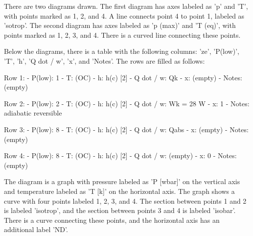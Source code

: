 There are two diagrams drawn. The first diagram has axes labeled as 'p' and 'T', with points marked as 1, 2, and 4. A line connects point 4 to point 1, labeled as 'sotrop'. The second diagram has axes labeled as 'p (max)' and 'T (eq)', with points marked as 1, 2, 3, and 4. There is a curved line connecting these points.

Below the diagrams, there is a table with the following columns: 'ze', 'P(low)', 'T', 'h', 'Q dot / w', 'x', and 'Notes'. The rows are filled as follows:

Row 1:
- P(low): 1
- T: (OC)
- h: h(c) [2]
- Q dot / w: Qk
- x: (empty)
- Notes: (empty)

Row 2:
- P(low): 2
- T: (OC)
- h: h(c) [2]
- Q dot / w: Wk = 28 W
- x: 1
- Notes: adiabatic reversible

Row 3:
- P(low): 8
- T: (OC)
- h: h(c) [2]
- Q dot / w: Qabs
- x: (empty)
- Notes: (empty)

Row 4:
- P(low): 8
- T: (OC)
- h: h(c) [2]
- Q dot / w: (empty)
- x: 0
- Notes: (empty)

The diagram is a graph with pressure labeled as 'P [wbar]' on the vertical axis and temperature labeled as 'T [k]' on the horizontal axis. The graph shows a curve with four points labeled 1, 2, 3, and 4. The section between points 1 and 2 is labeled 'isotrop', and the section between points 3 and 4 is labeled 'isobar'. There is a curve connecting these points, and the horizontal axis has an additional label 'ND'.